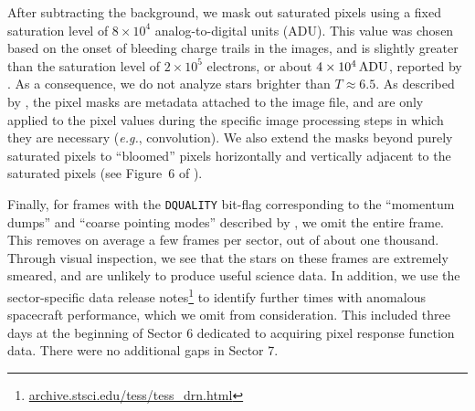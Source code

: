 \documentclass[12pt,twocolumn,tighten]{aastex62}
\begin{document}

After subtracting the background, we mask out saturated pixels using a
fixed saturation level of $8\times10^4$ analog-to-digital units (ADU). This value was
chosen based on the onset of bleeding charge trails in the images, and
is slightly greater than the saturation level of $2\times10^5$
electrons, or about $4\times10^4\,{\rm ADU}$, reported by
\citet{vanderspek_2018}. 
As a consequence, we do not analyze stars brighter than $T\approx 6.5$.
As described by \citet{Pal_2009}, the pixel masks are metadata attached
to the image file, and are only applied to the pixel values during the specific
image processing steps in which they are necessary ({\it e.g.},
convolution). We also extend the masks beyond purely saturated pixels
to ``bloomed'' pixels horizontally and vertically adjacent to the
saturated pixels (see Figure~6 of \citealt{Pal_2009}).

Finally, for frames with the \texttt{DQUALITY} bit-flag corresponding
to the ``momentum dumps'' and ``coarse pointing modes'' described by
\citet{vanderspek_2018}, we omit the entire frame.  This removes on
average a few frames per sector, out of about one thousand. Through
visual inspection, we see that the stars on these frames are extremely
smeared, and are unlikely to produce useful science data.  In
addition, we use the sector-specific data release notes\footnote{\url{
  archive.stsci.edu/tess/tess_drn.html}} to identify further times
with anomalous spacecraft performance, which we omit from
consideration.  This included three days at the
beginning of Sector 6 dedicated to acquiring pixel response function
data. There were no additional gaps in Sector 7.
\end{document}
